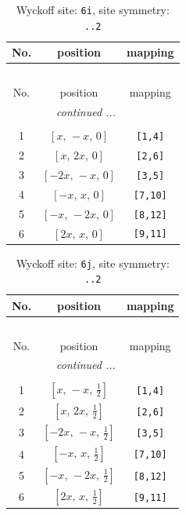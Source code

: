 \documentclass[fleqn,8pt]{jsarticle}
\begin{document}
\renewcommand{\arraystretch}{1.2}
\begin{longtable}{ccc}
\caption{Wyckoff site: {\tt 6i}, site symmetry: {\tt ..2}}
 \\
 \hline \hline
No. & position & mapping \\ \hline \endfirsthead

\multicolumn{2}{l}{\tablename\ \thetable{}} \\
 \hline \hline
No. & position & mapping \\ \hline \endhead

 \hline \hline
\multicolumn{2}{r}{\footnotesize\it continued ...} \\ \endfoot

 \hline \hline
\multicolumn{2}{r}{} \\ \endlastfoot

1 & $\left[ x,\, - x,\, 0 \right]$ & {\tt [1,4]} \\ \hline
2 & $\left[ x,\, 2 x,\, 0 \right]$ & {\tt [2,6]} \\ \hline
3 & $\left[ - 2 x,\, - x,\, 0 \right]$ & {\tt [3,5]} \\ \hline
4 & $\left[ - x,\, x,\, 0 \right]$ & {\tt [7,10]} \\ \hline
5 & $\left[ - x,\, - 2 x,\, 0 \right]$ & {\tt [8,12]} \\ \hline
6 & $\left[ 2 x,\, x,\, 0 \right]$ & {\tt [9,11]} \\
\end{longtable}
\renewcommand{\arraystretch}{1.2}
\begin{longtable}{ccc}
\caption{Wyckoff site: {\tt 6j}, site symmetry: {\tt ..2}}
 \\
 \hline \hline
No. & position & mapping \\ \hline \endfirsthead

\multicolumn{2}{l}{\tablename\ \thetable{}} \\
 \hline \hline
No. & position & mapping \\ \hline \endhead

 \hline \hline
\multicolumn{2}{r}{\footnotesize\it continued ...} \\ \endfoot

 \hline \hline
\multicolumn{2}{r}{} \\ \endlastfoot

1 & $\left[ x,\, - x,\, \frac{1}{2} \right]$ & {\tt [1,4]} \\ \hline
2 & $\left[ x,\, 2 x,\, \frac{1}{2} \right]$ & {\tt [2,6]} \\ \hline
3 & $\left[ - 2 x,\, - x,\, \frac{1}{2} \right]$ & {\tt [3,5]} \\ \hline
4 & $\left[ - x,\, x,\, \frac{1}{2} \right]$ & {\tt [7,10]} \\ \hline
5 & $\left[ - x,\, - 2 x,\, \frac{1}{2} \right]$ & {\tt [8,12]} \\ \hline
6 & $\left[ 2 x,\, x,\, \frac{1}{2} \right]$ & {\tt [9,11]} \\
\end{longtable}
\end{document}
